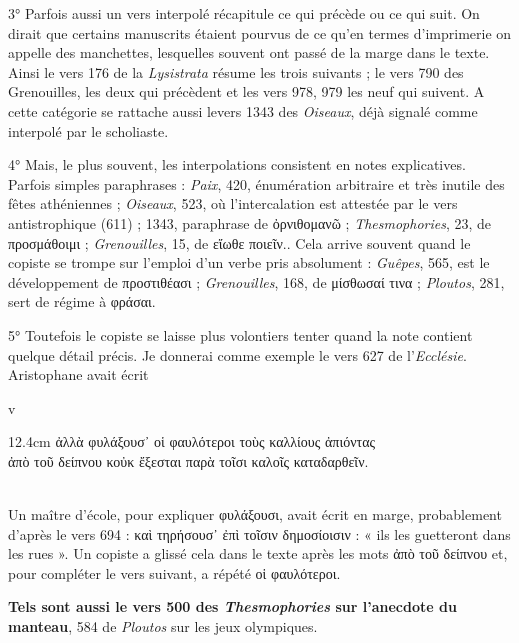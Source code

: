 \documentclass{book}%
\newcommand{\italique}[1]{\textit{#1}}%
\newcommand{\espace}[1]{\hspace{#1}}%
\newcommand{\fantome}{{\color{white}v}}
\newcommand{\citComm}[1]{\fantome\\
\espace{1cm}\begin{minipagewithmarginpars}{12.4cm}%
#1
\end{minipagewithmarginpars}%
}
\begin{document}
3°  	 Parfois aussi un vers interpolé récapitule ce qui précède ou ce qui suit. On dirait que certains manuscrits étaient pourvus de ce qu'en termes d'imprimerie on appelle des manchettes, lesquelles souvent ont passé de la marge dans le texte. Ainsi le vers 176 de la \italique{Lysistrata} résume les trois suivants ; le vers 790 des Grenouilles, les deux qui précèdent et les vers 978, 979 les neuf qui suivent. A cette catégorie se rattache aussi levers 1343 des \italique{Oiseaux}, déjà signalé comme interpolé par le scholiaste. 

4°  	 Mais, le plus souvent, les interpolations consistent en notes explicatives. Parfois simples paraphrases : \italique{Paix}, 420, énumération arbitraire et très inutile des fêtes athéniennes ; \italique{Oiseaux}, 523, où l'intercalation est attestée par le vers antistrophique (611) ; 1343, paraphrase de ὀρνιθομανῶ ; \italique{Thesmophories}, 23, de προσμάθοιμι ; \italique{Grenouilles}, 15, de εἴωθε ποιεῖν.. Cela arrive souvent quand le copiste se trompe sur l'emploi d'un verbe pris absolument : \italique{Guêpes}, 565, est le développement de προστιθέασι ; \italique{Grenouilles}, 168, de μίσθωσαί τινα ; \italique{Ploutos}, 281, sert de régime à φράσαι. 

5° 	Toutefois le copiste se laisse plus volontiers tenter quand la note contient quelque détail précis. Je donnerai comme exemple le vers 627 de l'\italique{Ecclésie}. Aristophane avait écrit 

\citComm{ἀλλὰ φυλάξουσ᾽ οἱ φαυλότεροι τοὺς καλλίους ἀπιόντας\\
	ἀπὸ τοῦ δείπνου κοὐκ ἔξεσται παρὰ τοῖσι καλοῖς καταδαρθεῖν.}\\


Un maître d'école, pour expliquer φυλάξουσι, avait écrit en marge, probablement d'après le vers 694 : καὶ τηρήσουσ᾽ ἐπὶ τοῖσιν δημοσίοισιν : « ils les guetteront dans les rues ». Un copiste a glissé cela dans le texte après les mots ἀπὸ τοῦ δείπνου et, pour compléter le vers suivant, a répété οἱ φαυλότεροι. 

\textbf{Tels sont aussi le vers 500 des \italique{Thesmophories} sur l'anecdote du manteau}, 584 de \italique{Ploutos} sur les jeux olympiques. 
\end{document}
